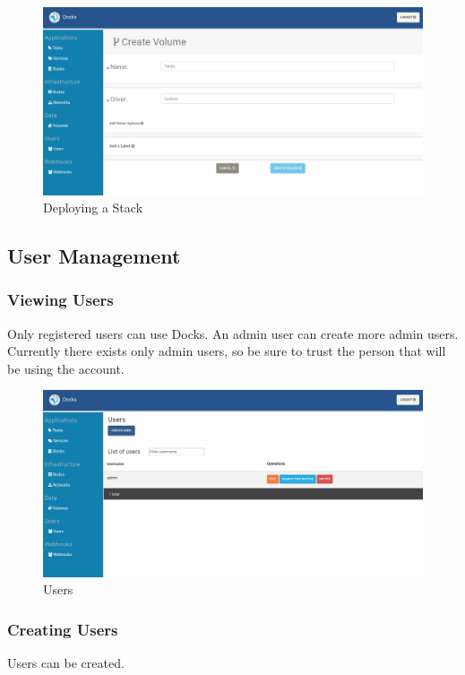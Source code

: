 \documentclass[]{article}
\begin{document}
\begin{figure}[H]
	\centering
	\includegraphics[scale=0.4]{volumes_create.png}
	\caption{Deploying a Stack}
\end{figure}

\subsection{User Management}
\label{sec:user_management}
\subsubsection{Viewing Users}
Only registered users can use Docks. An admin user can create more admin users.
Currently there exists only admin users, so be sure to trust the person that will
be using the account.
\begin{figure}[H]
	\centering
	\includegraphics[scale=0.4]{users.png}
	\caption{Users}
\end{figure}

\subsubsection{Creating Users}
Users can be created.
\end{document}

